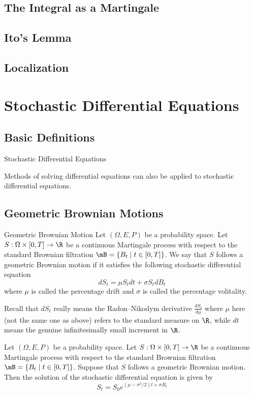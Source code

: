 \documentclass[a4paper]{article}
\begin{document}
\subsection{The Integral as a Martingale}

\subsection{Ito's Lemma}

\subsection{Localization}

\pagebreak
\section{Stochastic Differential Equations}
\subsection{Basic Definitions}
\begin{defn}{Stochastic Differential Equations}{}
\end{defn}

Methods of solving differential equations can also be applied to stochastic differential equations. 

\subsection{Geometric Brownian Motions}
\begin{defn}{Geometric Brownian Motion}{} Let $(\Omega,E,P)$ be a probability space. Let $S:\Omega\times[0,T]\to\R$ be a continuous Martingale process with respect to the standard Brownian filtration $\mB=\{B_t\;|\;t\in[0,T]\}$. We say that $S$ follows a geometric Brownian motion if it satisfies the following stochastic differential equation $$dS_t=\mu S_tdt+\sigma S_tdB_t$$ where $\mu$ is called the percentage drift and $\sigma$ is called the percentage volitality. 
\end{defn}

Recall that $dS_t$ really means the Radon–Nikodym derivative $\frac{dS_t}{d\mu}$ where $\mu$ here (not the same one as above) refers to the standard measure on $\R$, while $dt$ means the genuine infinitesimally small increment in $\R$. 

\begin{lmm}{}{} Let $(\Omega,E,P)$ be a probability space. Let $S:\Omega\times[0,T]\to\R$ be a continuous Martingale process with respect to the standard Brownian filtration $\mB=\{B_t\;|\;t\in[0,T]\}$. Suppose that $S$ follows a geometric Brownian motion. Then the solution of the stochastic differential equation is given by $$S_t=S_0e^{(\mu-\sigma^2/2)t+\sigma B_t}$$
\end{lmm}
\end{document}
